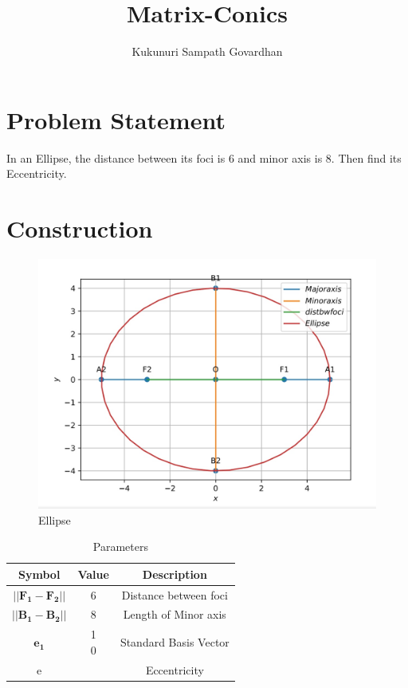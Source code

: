 \documentclass[journal,12pt,twocolumn]{IEEEtran}
\title{
Matrix-Conics
}
\author{Kukunuri Sampath Govardhan}
\newcommand{\myvec}[1]{\ensuremath{\begin{pmatrix}#1\end{pmatrix}}}
\let\vec\mathbf
\begin{document}
\maketitle
\tableofcontents
\bigskip

\section{Problem Statement}
\begin{flushleft}
In an Ellipse, the distance between its foci is 6 and minor axis is 8. Then find its Eccentricity.\\
\end{flushleft}
\section{Construction}
\begin{figure}[h]
    \centering
\includegraphics[width=\columnwidth]{figs/assign6.png}
    \caption{Ellipse}
    \label{fig:my_label}
\end{figure}
\begin{table}[h]
    \centering
    \begin{tabular}{|c|c|c|}
       \hline
       \textbf{Symbol}&\textbf{Value}&\textbf{Description}  \\
       \hline
            ${||\vec{F_1} - \vec{F_2}||}$ & 6 & Distance between foci\\
        \hline
            ${||\vec{B_1} - \vec{B_2}||}$ & 8 & Length of Minor axis\\
        \hline
        $\vec{e_1}$ & \myvec{1 \\ 0} & Standard Basis Vector \\
        \hline
        e & & Eccentricity \\
            \hline
    \end{tabular}
    \caption{Parameters}
    \label{tab:my_label}
\end{table}
\vspace{2cm}
\end{document}
